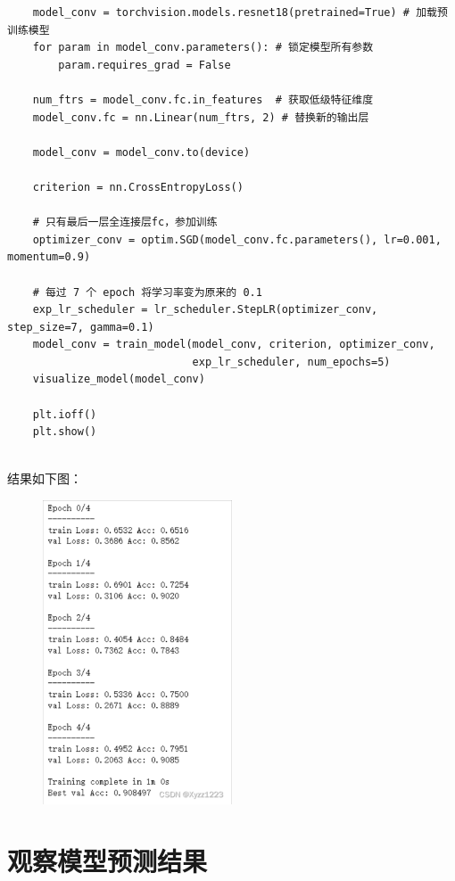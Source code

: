\documentclass[12pt, a4paper, oneside]{ctexart} %
\begin{document}
\begin{lstlisting}
    model_conv = torchvision.models.resnet18(pretrained=True) # 加载预训练模型
    for param in model_conv.parameters(): # 锁定模型所有参数
        param.requires_grad = False
    
    num_ftrs = model_conv.fc.in_features  # 获取低级特征维度
    model_conv.fc = nn.Linear(num_ftrs, 2) # 替换新的输出层
    
    model_conv = model_conv.to(device)
    
    criterion = nn.CrossEntropyLoss()
    
    # 只有最后一层全连接层fc，参加训练
    optimizer_conv = optim.SGD(model_conv.fc.parameters(), lr=0.001, momentum=0.9)
    
    # 每过 7 个 epoch 将学习率变为原来的 0.1 
    exp_lr_scheduler = lr_scheduler.StepLR(optimizer_conv, step_size=7, gamma=0.1)
    model_conv = train_model(model_conv, criterion, optimizer_conv,
                             exp_lr_scheduler, num_epochs=5)
    visualize_model(model_conv)
    
    plt.ioff()
    plt.show()
    
\end{lstlisting}

结果如下图：

\begin{figure}[H]
\centering
\includegraphics[width=0.5\textwidth]{2.png}
\end{figure}


\section{观察模型预测结果}
\end{document}
